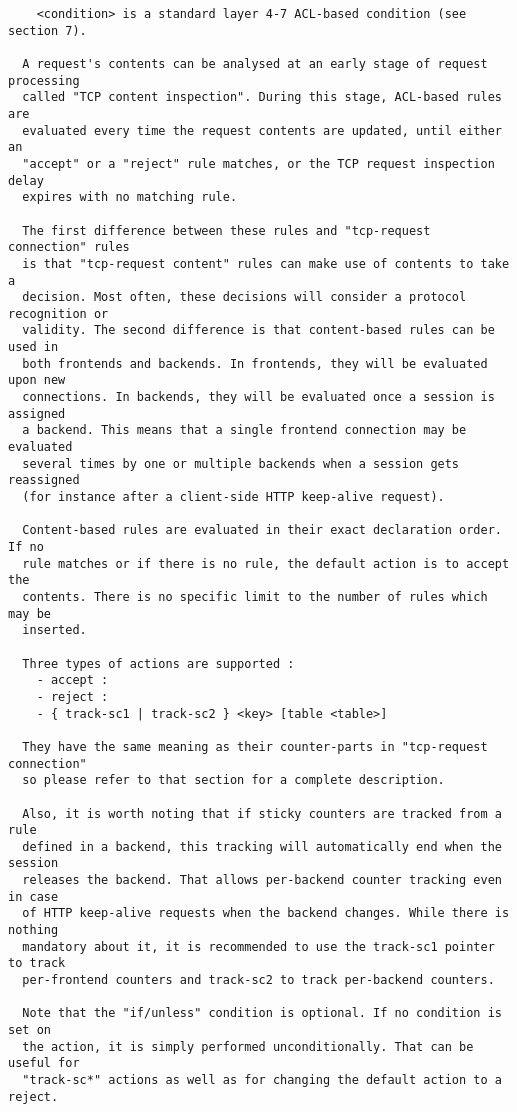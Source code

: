 \begin{verbatim}
    <condition> is a standard layer 4-7 ACL-based condition (see section 7).

  A request's contents can be analysed at an early stage of request processing
  called "TCP content inspection". During this stage, ACL-based rules are
  evaluated every time the request contents are updated, until either an
  "accept" or a "reject" rule matches, or the TCP request inspection delay
  expires with no matching rule.

  The first difference between these rules and "tcp-request connection" rules
  is that "tcp-request content" rules can make use of contents to take a
  decision. Most often, these decisions will consider a protocol recognition or
  validity. The second difference is that content-based rules can be used in
  both frontends and backends. In frontends, they will be evaluated upon new
  connections. In backends, they will be evaluated once a session is assigned
  a backend. This means that a single frontend connection may be evaluated
  several times by one or multiple backends when a session gets reassigned
  (for instance after a client-side HTTP keep-alive request).

  Content-based rules are evaluated in their exact declaration order. If no
  rule matches or if there is no rule, the default action is to accept the
  contents. There is no specific limit to the number of rules which may be
  inserted.

  Three types of actions are supported :
    - accept :
    - reject :
    - { track-sc1 | track-sc2 } <key> [table <table>]

  They have the same meaning as their counter-parts in "tcp-request connection"
  so please refer to that section for a complete description.

  Also, it is worth noting that if sticky counters are tracked from a rule
  defined in a backend, this tracking will automatically end when the session
  releases the backend. That allows per-backend counter tracking even in case
  of HTTP keep-alive requests when the backend changes. While there is nothing
  mandatory about it, it is recommended to use the track-sc1 pointer to track
  per-frontend counters and track-sc2 to track per-backend counters.

  Note that the "if/unless" condition is optional. If no condition is set on
  the action, it is simply performed unconditionally. That can be useful for
  "track-sc*" actions as well as for changing the default action to a reject.


\end{verbatim}
